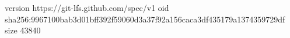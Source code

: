 version https://git-lfs.github.com/spec/v1
oid sha256:9967100bab3d01bff392f59060d3a37f92a156caca3df435179a1374359729df
size 43840
